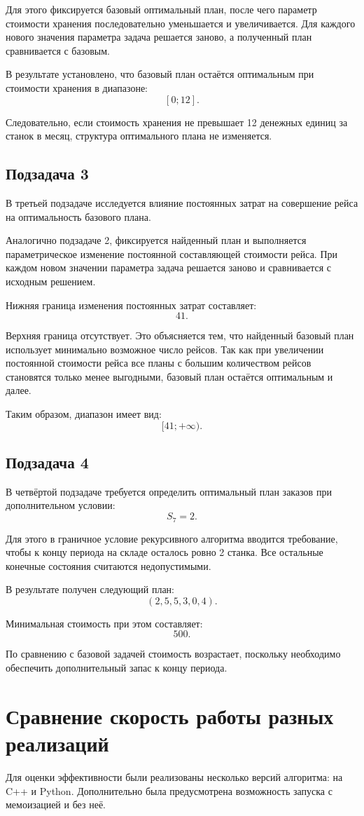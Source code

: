\documentclass[a4paper,12pt]{article}
\begin{document}
Для этого фиксируется базовый оптимальный план, после чего параметр стоимости хранения последовательно уменьшается и увеличивается. Для каждого нового значения параметра задача решается заново, а полученный план сравнивается с базовым.

В результате установлено, что базовый план остаётся оптимальным при стоимости хранения в диапазоне:
\[
[0; 12].
\]

Следовательно, если стоимость хранения не превышает 12 денежных единиц за станок в месяц, структура оптимального плана не изменяется.
\subsection{Подзадача 3}
В третьей подзадаче исследуется влияние постоянных затрат на совершение рейса на оптимальность базового плана.

Аналогично подзадаче 2, фиксируется найденный план и выполняется параметрическое изменение постоянной составляющей стоимости рейса. При каждом новом значении параметра задача решается заново и сравнивается с исходным решением.

Нижняя граница изменения постоянных затрат составляет:
\[
41.
\]

Верхняя граница отсутствует. Это объясняется тем, что найденный базовый план использует минимально возможное число рейсов. Так как при увеличении постоянной стоимости рейса все планы с большим количеством рейсов становятся только менее выгодными, базовый план остаётся оптимальным и далее.

Таким образом, диапазон имеет вид:
\[
[41; +\infty).
\]
\subsection{Подзадача 4}
В четвёртой подзадаче требуется определить оптимальный план заказов при дополнительном условии:
\[
S_7 = 2.
\]

Для этого в граничное условие рекурсивного алгоритма вводится требование, чтобы к концу периода на складе осталось ровно 2 станка. Все остальные конечные состояния считаются недопустимыми.

В результате получен следующий план:
\[
(2, 5, 5, 3, 0, 4).
\]

Минимальная стоимость при этом составляет:
\[
500.
\]

По сравнению с базовой задачей стоимость возрастает, поскольку необходимо обеспечить дополнительный запас к концу периода.

\section{Сравнение скорость работы разных реализаций}
Для оценки эффективности были реализованы несколько версий алгоритма: на C++ и Python. Дополнительно была предусмотрена возможность запуска с мемоизацией и без неё.
\end{document}
